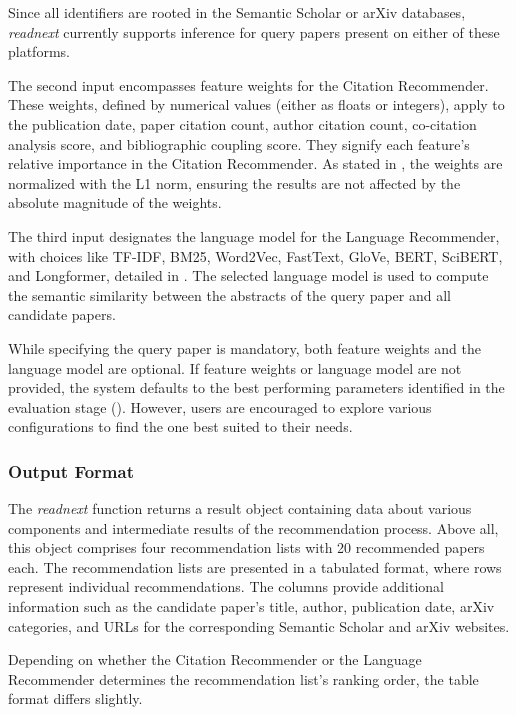 Since all identifiers are rooted in the Semantic Scholar or arXiv databases, \emph{readnext} currently supports inference for query papers present on either of these platforms.

The second input encompasses feature weights for the Citation Recommender. These weights, defined by numerical values (either as floats or integers), apply to the publication date, paper citation count, author citation count, co-citation analysis score, and bibliographic coupling score.
They signify each feature's relative importance in the Citation Recommender.
As stated in , the weights are normalized with the L1 norm, ensuring the results are not affected by the absolute magnitude of the weights.

The third input designates the language model for the Language Recommender, with choices like TF-IDF, BM25, Word2Vec, FastText, GloVe, BERT, SciBERT, and Longformer, detailed in . The selected language model is used to compute the semantic similarity between the abstracts of the query paper and all candidate papers.

While specifying the query paper is mandatory, both feature weights and the language model are optional. If feature weights or language model are not provided, the system defaults to the best performing parameters identified in the evaluation stage (). However, users are encouraged to explore various configurations to find the one best suited to their needs.


\subsubsection*{Output Format}

The \emph{readnext} function returns a result object containing data about various components and intermediate results of the recommendation process. Above all, this object comprises four recommendation lists with 20 recommended papers each.
The recommendation lists are presented in a tabulated format, where rows represent individual recommendations.
The columns provide additional information such as the candidate paper's title, author, publication date, arXiv categories, and URLs for the corresponding Semantic Scholar and arXiv websites.

Depending on whether the Citation Recommender or the Language Recommender determines the recommendation list's ranking order, the table format differs slightly.

